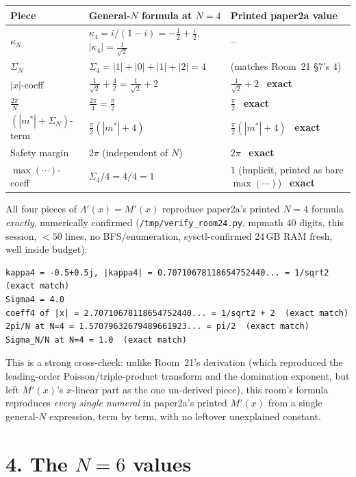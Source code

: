 \documentclass[11pt]{article}
\begin{document}
\begin{center}
\begin{tabular}{lll}
Piece & General-$N$ formula at $N=4$ & Printed paper2a value\\\hline
$\kappa_N$ & $\kappa_4=i/(1-i)=-\frac12+\frac i2$, $|\kappa_4|=\frac1{\sqrt2}$ & --\\
$\Sigma_N$ & $\Sigma_4=|1|+|0|+|1|+|2|=4$ & (matches Room~21 \S7's $4$)\\
$|x|$-coeff & $\frac1{\sqrt2}+\frac42=\frac1{\sqrt2}+2$ & $\frac1{\sqrt2}+2$ \ \textbf{exact}\\
$\frac{2\pi}N$ & $\frac{2\pi}4=\frac\pi2$ & $\frac\pi2$ \ \textbf{exact}\\
$(|m^\ast|+\Sigma_N)$-term & $\frac\pi2(|m^\ast|+4)$ & $\frac\pi2(|m^\ast|+4)$ \ \textbf{exact}\\
Safety margin & $2\pi$ (independent of $N$) & $2\pi$ \ \textbf{exact}\\
$\max(\cdots)$-coeff & $\Sigma_4/4=4/4=1$ & $1$ (implicit, printed as bare $\max(\cdots)$) \
\textbf{exact}\\
\end{tabular}
\end{center}
All four pieces of $\Lambda'(x)=M'(x)$ reproduce paper2a's printed $N=4$ formula \emph{exactly},
numerically confirmed (\texttt{/tmp/verify\_room24.py}, mpmath 40 digits, this session, $<50$
lines, no BFS/enumeration, sysctl-confirmed 24\,GB RAM fresh, well inside budget):
\begin{verbatim}
kappa4 = -0.5+0.5j, |kappa4| = 0.70710678118654752440... = 1/sqrt2  (exact match)
Sigma4 = 4.0
coeff4 of |x| = 2.70710678118654752440... = 1/sqrt2 + 2  (exact match)
2pi/N at N=4 = 1.57079632679489661923... = pi/2  (exact match)
Sigma_N/N at N=4 = 1.0  (exact match)
\end{verbatim}
This is a strong cross-check: unlike Room~21's derivation (which reproduced the leading-order
Poisson/triple-product transform and the domination exponent, but left $M'(x)$'s $x$-linear part
as the one un-derived piece), this room's formula reproduces \emph{every single numeral} in
paper2a's printed $M'(x)$ from a single general-$N$ expression, term by term, with no leftover
unexplained constant.

\section*{4. The $N=6$ values}
\end{document}
